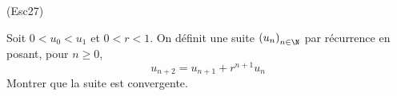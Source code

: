 \begin{tiny}(Esc27)\end{tiny} Soit $0<u_0<u_1$ et $0<r<1$. On définit une suite $\left( u_n\right) _{n\in \N}$ par récurrence en posant, pour $n\geq 0$,
\begin{displaymath}
 u_{n+2} = u_{n+1} +r^{n+1}u_n
\end{displaymath}
Montrer que la suite est convergente.